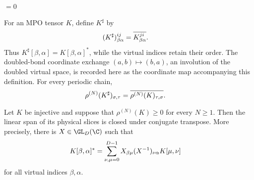 \begin{center}
    \tenkzkernel
    \begin{tenkz}[rows={op,op}, cols=1, west=open, east=open, physical=updown]
         \\
    \end{tenkz}
    $ = 0$
\end{center}

\begin{definition}
    \label{def:mpdo_physical_adjoint}
    \leanok
    For an MPO tensor $K$, define $K^\sharp$ by
    \begin{align}
        (K^\sharp)^{ij}_{\beta\alpha}
         & =\overline{K^{ji}_{\beta\alpha}}.
        \notag
    \end{align}
    Thus $K^\sharp[\beta,\alpha]=K[\beta,\alpha]^*$, while the virtual
    indices retain their order. The doubled-bond coordinate exchange
    $(a,b)\mapsto(b,a)$, an involution of the doubled virtual space, is
    recorded here as the coordinate map accompanying this definition.
    For every periodic chain,
    \begin{align}
        \rho^{(N)}(K^\sharp)_{\sigma,\tau}
         & =\overline{\rho^{(N)}(K)_{\tau,\sigma}}.
        \notag
    \end{align}
\end{definition}

\begin{lemma}
    \label{thm:mpdo_injective_mpdo_adjoint_closure}
    \leanok
    Let $K$ be injective and suppose that $\rho^{(N)}(K)\geq0$ for every
    $N\geq1$. Then the linear span of its physical slices is closed under
    conjugate transpose. More precisely, there is $X\in\GL_D(\C)$ such that
    \begin{align}
        K[\beta,\alpha]^*
         & =\sum_{\nu,\mu=0}^{D-1}
        X_{\beta\mu}(X^{-1})_{\nu\alpha}K[\mu,\nu]
        \notag
    \end{align}
    for all virtual indices $\beta,\alpha$.
\end{lemma}

